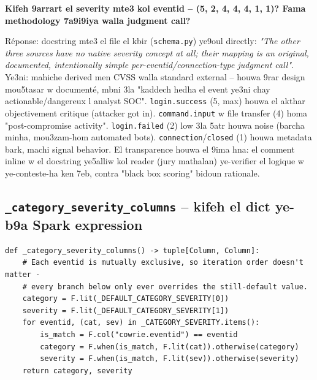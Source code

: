 \documentclass[11pt,a4paper]{report}
\DeclareRobustCommand{\code}[1]{\texttt{#1}}
\begin{document}
\begin{soual}
\textbf{Kifeh 9arrart el severity mte3 kol eventid -- (5, 2, 4, 4, 4, 1,
1)? Fama methodology 7a9i9iya walla judgment call?}

Réponse: docstring mte3 el file el kbir (\code{schema.py}) ye9oul directly:
\emph{"The other three sources have no native severity concept at all;
their mapping is an original, documented, intentionally simple
per-eventid/connection-type judgment call"}. Ye3ni: mahiche derived men
CVSS walla standard external -- houwa 9rar design mou5tasar w documenté,
mbni 3la "kaddech hedha el event ye3ni chay actionable/dangereux l analyst
SOC". \code{login.success} (5, max) houwa el akthar objectivement critique
(attacker got in). \code{command.input} w file transfer (4) homa
"post-compromise activity". \code{login.failed} (2) low 3la 5atr houwa
noise (barcha minha, mou3zam-hom automated bots). \code{connection}/\code{closed}
(1) houwa metadata bark, machi signal behavior. El transparence houwa el
9ima hna: el comment inline w el docstring ye5alliw kol reader (jury
mathalan) ye-verifier el logique w ye-conteste-ha ken 7eb, contra "black
box scoring" bidoun rationale.
\end{soual}

\subsection{\code{\_category\_severity\_columns} -- kifeh el dict ye-b9a Spark expression}

\begin{lstlisting}[style=pystyle]
def _category_severity_columns() -> tuple[Column, Column]:
    # Each eventid is mutually exclusive, so iteration order doesn't matter -
    # every branch below only ever overrides the still-default value.
    category = F.lit(_DEFAULT_CATEGORY_SEVERITY[0])
    severity = F.lit(_DEFAULT_CATEGORY_SEVERITY[1])
    for eventid, (cat, sev) in _CATEGORY_SEVERITY.items():
        is_match = F.col("cowrie.eventid") == eventid
        category = F.when(is_match, F.lit(cat)).otherwise(category)
        severity = F.when(is_match, F.lit(sev)).otherwise(severity)
    return category, severity
\end{lstlisting}
\end{document}
